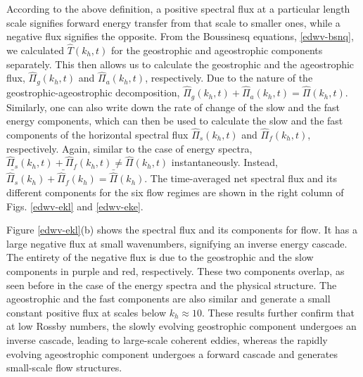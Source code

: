 \documentclass[../Rajarshi-thesis-draft.tex]{subfiles}
\begin{document}
According to the above definition, a positive spectral flux at a particular length scale signifies forward energy transfer from that scale to smaller ones, while a negative flux signifies the opposite. From the Boussinesq equations, \eqref{edwv-bsnq}, we calculated $\hat{T}(k_h, t)$ for the geostrophic and ageostrophic components separately. This then allows us to calculate the geostrophic and the ageostrophic flux, $\hat{\Pi}_g(k_h, t)$ and $\hat{\Pi}_a(k_h, t)$, respectively. Due to the nature of the geostrophic-ageostrophic decomposition, $\hat{\Pi}_g(k_h, t) + \hat{\Pi}_a(k_h, t) = \hat{\Pi}(k_h, t)$. Similarly, one can also write down the rate of change of the slow and the fast energy components, which can then be used to calculate the slow and the fast components of the horizontal spectral flux $\hat{\Pi}_s(k_h, t)$ and $\hat{\Pi}_f(k_h, t)$, respectively. Again, similar to the case of energy spectra,  $\hat{\Pi}_s(k_h, t) + \hat{\Pi}_f(k_h, t) \neq \hat{\Pi}(k_h, t)$ instantaneously. Instead, $\bar{\hat{\Pi}_s}(k_h) + \bar{\hat{\Pi}_f}(k_h) = \bar{\hat{\Pi}}(k_h)$. The time-averaged net spectral flux and its different components for the six flow regimes are shown in the right column of Figs. \ref{edwv-ekl} and \ref{edwv-eke}.

Figure \ref{edwv-ekl}(b) shows the spectral flux and its components for \lre flow. It has a large negative flux at small wavenumbers, signifying an inverse energy cascade. The entirety of the negative flux is due to the geostrophic and the slow components in purple and red, respectively. These two components overlap, as seen before in the case of the energy spectra and the physical structure. The ageostrophic and the fast components are also similar and generate a small constant positive flux at scales below  $k_h \approx 10$. %
These results further confirm that at low Rossby numbers, the slowly evolving geostrophic component undergoes an inverse cascade, leading to large-scale coherent eddies, whereas the rapidly evolving ageostrophic component undergoes a forward cascade and generates small-scale flow structures.
\end{document}
